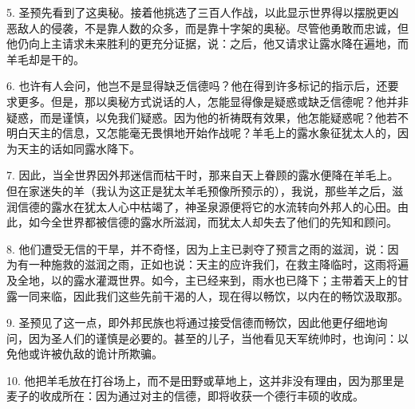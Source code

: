 5. 圣预先看到了这奥秘。接着他挑选了三百人作战，以此显示世界得以摆脱更凶恶敌人的侵袭，不是靠人数的众多，而是靠十字架的奥秘。尽管他勇敢而忠诚，但他仍向上主请求未来胜利的更充分证据，说：之后，他又请求让露水降在遍地，而羊毛却是干的。\par

6. 也许有人会问，他岂不是显得缺乏信德吗？他在得到许多标记的指示后，还要求更多。但是，那以奥秘方式说话的人，怎能显得像是疑惑或缺乏信德呢？他并非疑惑，而是谨慎，以免我们疑惑。因为他的祈祷既有效果，他怎能疑惑呢？他若不明白天主的信息，又怎能毫无畏惧地开始作战呢？羊毛上的露水象征犹太人的，因为天主的话如同露水降下。\par

7. 因此，当全世界因外邦迷信而枯干时，那来自天上眷顾的露水便降在羊毛上。但在家迷失的羊（我认为这正是犹太羊毛预像所预示的），我说，那些羊之后，滋润信德的露水在犹太人心中枯竭了，神圣泉源便将它的水流转向外邦人的心田。由此，如今全世界都被信德的露水所滋润，而犹太人却失去了他们的先知和顾问。\par

8. 他们遭受无信的干旱，并不奇怪，因为上主已剥夺了预言之雨的滋润，说：因为有一种施救的滋润之雨，正如也说：天主的应许我们，在救主降临时，这雨将遍及全地，以的露水灌溉世界。如今，主已经来到，雨水也已降下；主带着天上的甘露一同来临，因此我们这些先前干渴的人，现在得以畅饮，以内在的畅饮汲取那。\par

9. 圣预见了这一点，即外邦民族也将通过接受信德而畅饮，因此他更仔细地询问，因为圣人们的谨慎是必要的。甚至的儿子，当他看见天军统帅时，也询问：以免他或许被仇敌的诡计所欺骗。\par

10. 他把羊毛放在打谷场上，而不是田野或草地上，这并非没有理由，因为那里是麦子的收成所在：因为通过对主的信德，即将收获一个德行丰硕的收成。\par

